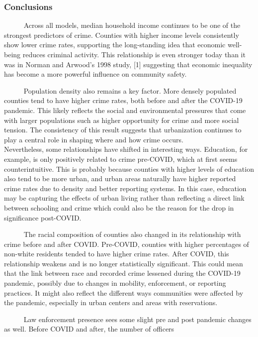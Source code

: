 \documentclass[
  11pt,
  letterpaper,
  DIV=11,
  numbers=noendperiod]{scrartcl}
\begin{document}
\subsubsection{Conclusions}\label{conclusions}

~~~~~ Across all models, median household income continues to be one of
the strongest predictors of crime. Counties with higher income levels
consistently show lower crime rates, supporting the long-standing idea
that economic well-being reduces criminal activity. This relationship is
even stronger today than it was in Norman and Arwood's 1998 study,
{[}1{]} suggesting that economic inequality has become a more powerful
influence on community safety.\\
\strut ~~~~~ Population density also remains a key factor. More densely
populated counties tend to have higher crime rates, both before and
after the COVID-19 pandemic. This likely reflects the social and
environmental pressures that come with larger populations such as higher
opportunity for crime and more social tension. The consistency of this
result suggests that urbanization continues to play a central role in
shaping where and how crime occurs.\\
Nevertheless, some relationships have shifted in interesting ways.
Education, for example, is only positively related to crime pre-COVID,
which at first seems counterintuitive. This is probably because counties
with higher levels of education also tend to be more urban, and urban
areas naturally have higher reported crime rates due to density and
better reporting systems. In this case, education may be capturing the
effects of urban living rather than reflecting a direct link between
schooling and crime which could also be the reason for the drop in
significance post-COVID.\\
\strut ~~~~~ The racial composition of counties also changed in its
relationship with crime before and after COVID. Pre-COVID, counties with
higher percentages of non-white residents tended to have higher crime
rates. After COVID, this relationship weakens and is no longer
statistically significant. This could mean that the link between race
and recorded crime lessened during the COVID-19 pandemic, possibly due
to changes in mobility, enforcement, or reporting practices. It might
also reflect the different ways communities were affected by the
pandemic, especially in urban centers and areas with reservations.\\
\strut ~~~~~ Law enforcement presence sees some slight pre and post
pandemic changes as well. Before COVID and after, the number of officers
\end{document}
